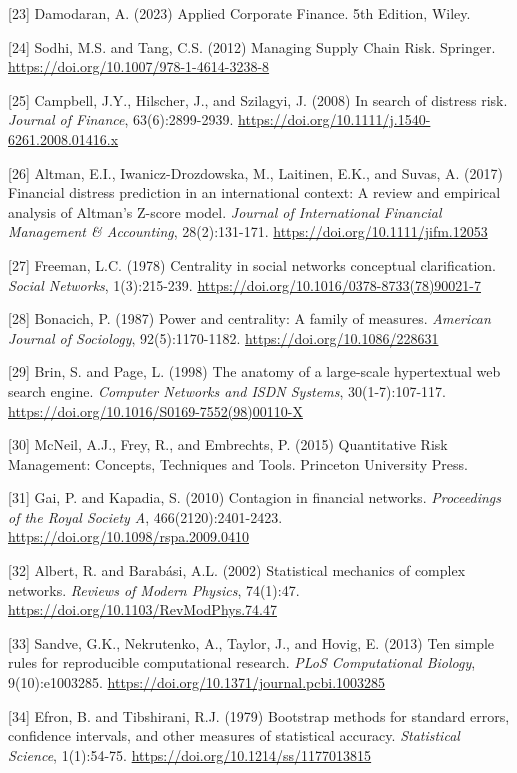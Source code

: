 \documentclass[a4 paper, 11pt,twoside]{article}
\newcommand{\0}{\Bf{0}}
\theoremstyle{definition}
\begin{document}
\label{ref23}[23] Damodaran, A. (2023) Applied Corporate Finance. 5th Edition, Wiley.

\label{ref24}[24] Sodhi, M.S. and Tang, C.S. (2012) Managing Supply Chain Risk. Springer. \href{https://doi.org/10.1007/978-1-4614-3238-8}{https://doi.org/10.1007/978-1-4614-3238-8}

\label{ref25}[25] Campbell, J.Y., Hilscher, J., and Szilagyi, J. (2008) In search of distress risk. \emph{Journal of Finance}, 63(6):2899-2939. \href{https://doi.org/10.1111/j.1540-6261.2008.01416.x}{https://doi.org/10.1111/j.1540-6261.2008.01416.x}

\label{ref26}[26] Altman, E.I., Iwanicz-Drozdowska, M., Laitinen, E.K., and Suvas, A. (2017) Financial distress prediction in an international context: A review and empirical analysis of Altman's Z-score model. \emph{Journal of International Financial Management \& Accounting}, 28(2):131-171. \href{https://doi.org/10.1111/jifm.12053}{https://doi.org/10.1111/jifm.12053}

\label{ref27}[27] Freeman, L.C. (1978) Centrality in social networks conceptual clarification. \emph{Social Networks}, 1(3):215-239. \href{https://doi.org/10.1016/0378-8733(78)90021-7}{https://doi.org/10.1016/0378-8733(78)90021-7}

\label{ref28}[28] Bonacich, P. (1987) Power and centrality: A family of measures. \emph{American Journal of Sociology}, 92(5):1170-1182. \href{https://doi.org/10.1086/228631}{https://doi.org/10.1086/228631}

\label{ref29}[29] Brin, S. and Page, L. (1998) The anatomy of a large-scale hypertextual web search engine. \emph{Computer Networks and ISDN Systems}, 30(1-7):107-117. \href{https://doi.org/10.1016/S0169-7552(98)00110-X}{https://doi.org/10.1016/S0169-7552(98)00110-X}

\label{ref30}[30] McNeil, A.J., Frey, R., and Embrechts, P. (2015) Quantitative Risk Management: Concepts, Techniques and Tools. Princeton University Press.

\label{ref31}[31] Gai, P. and Kapadia, S. (2010) Contagion in financial networks. \emph{Proceedings of the Royal Society A}, 466(2120):2401-2423. \href{https://doi.org/10.1098/rspa.2009.0410}{https://doi.org/10.1098/rspa.2009.0410}

\label{ref32}[32] Albert, R. and Barabási, A.L. (2002) Statistical mechanics of complex networks. \emph{Reviews of Modern Physics}, 74(1):47. \href{https://doi.org/10.1103/RevModPhys.74.47}{https://doi.org/10.1103/RevModPhys.74.47}

\label{ref33}[33] Sandve, G.K., Nekrutenko, A., Taylor, J., and Hovig, E. (2013) Ten simple rules for reproducible computational research. \emph{PLoS Computational Biology}, 9(10):e1003285. \href{https://doi.org/10.1371/journal.pcbi.1003285}{https://doi.org/10.1371/journal.pcbi.1003285}

\label{ref34}[34] Efron, B. and Tibshirani, R.J. (1979) Bootstrap methods for standard errors, confidence intervals, and other measures of statistical accuracy. \emph{Statistical Science}, 1(1):54-75. \href{https://doi.org/10.1214/ss/1177013815}{https://doi.org/10.1214/ss/1177013815}
\end{document}
